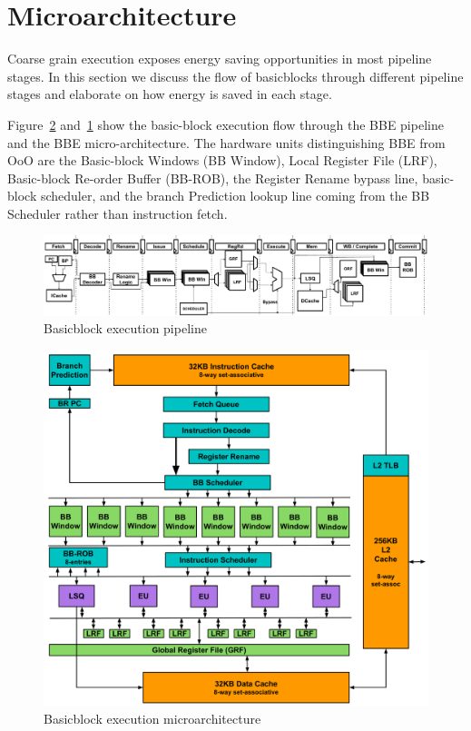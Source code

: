 \section{Microarchitecture}

Coarse grain execution exposes energy saving opportunities in most pipeline
stages. In this section we discuss the flow of basicblocks through different
pipeline stages and elaborate on how energy is saved in each stage.

Figure~\ref{fig:bb_arch} and~\ref{fig:pipeline} show the basic-block execution
flow through the BBE pipeline and the BBE micro-architecture. The hardware units
distinguishing BBE from OoO are the Basic-block Windows (BB Window), Local Register
File (LRF), Basic-block Re-order Buffer (BB-ROB), the Register Rename bypass
line, basic-block scheduler, and the branch Prediction lookup line coming 
from the BB Scheduler rather than instruction fetch.

\begin{figure}
	\centering
	\includegraphics[width=\textwidth]{fig/pipeline.pdf} 
	\caption{Basicblock execution pipeline}
	\label{fig:pipeline}
\end{figure}

\begin{figure}
	\centering
	\includegraphics[width=1.0\columnwidth]{fig/bb_architecture.pdf} 
	\caption{Basicblock execution microarchitecture}
	\label{fig:bb_arch}
\end{figure}

